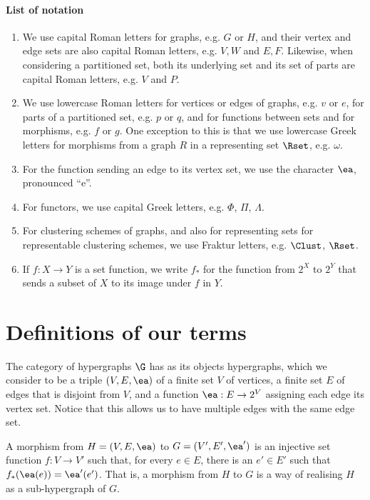 \documentclass[a4paper,reqno,oneside]{article} %
\begin{document}
\paragraph*{List of notation}
\begin{enumerate}
    \item We use capital Roman letters for graphs, e.g. $G$ or $H$, and their vertex and edge sets are also capital Roman letters, e.g. $V, W$ and $E, F$. Likewise, when considering a partitioned set, both its underlying set and its set of parts are capital Roman letters, e.g. $V$ and $P$. 
    \item We use lowercase Roman letters for vertices or edges of graphs, e.g. $v$ or $e$, for parts of a partitioned set, e.g. $p$ or $q$, and for functions between sets and for morphisms, e.g. $f$ or $g$. One exception to this is that we use lowercase Greek letters for morphisms from a graph $R$ in a representing set $\Rset$, e.g. $\omega$.
    \item For the function sending an edge to its vertex set, we use the character $\ea$, pronounced ``e''.
    \item For functors, we use capital Greek letters, e.g. $\Phi$, $\Pi$, $\Lambda$.
    \item For clustering schemes of graphs, and also for representing sets for representable clustering schemes, we use Fraktur letters, e.g. $\Clust$, $\Rset$.
    \item If $f: X \to Y$ is a set function, we write $f_*$ for the function from $2^X$ to $2^Y$ that sends a subset of $X$ to its image under $f$ in $Y$.
\end{enumerate}

\section{Definitions of our terms}

\begin{definition}
    The category of hypergraphs $\G$ has as its objects hypergraphs, which we consider to be a triple $(V,E,\ea)$ of a finite set $V$ of vertices, a finite set $E$ of edges that is disjoint from $V$, and a function $\ea: E \to 2^V$ assigning each edge its vertex set. Notice that this allows us to have multiple edges with the same edge set.
    
    A morphism from $H = (V,E,\ea)$ to $G = (V', E',\ea')$ is an injective set function $f: V \to V'$ such that, for every $e \in E$, there is an $e' \in E'$ such that $f_*(\ea(e)) = \ea'(e')$. That is, a morphism from $H$ to $G$ is a way of realising $H$ as a sub-hypergraph of $G$.
\end{definition}
\end{document}
